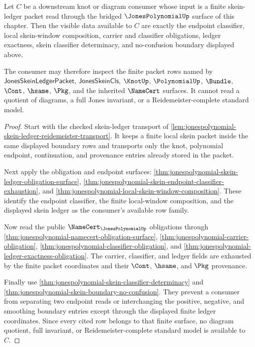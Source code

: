 \begin{theorem}
\label{thm:jonespolynomial-mature-consumer-example}
Let $C$ be a downstream knot or diagram consumer whose input is a finite
skein-ledger packet read through the bridged $\JonesPolynomialUp$ surface of
this chapter. Then the visible data available to $C$ are exactly the endpoint
classifier, local skein-window composition, carrier and classifier obligations,
ledger exactness, skein classifier determinacy, and no-confusion boundary
displayed above.

The consumer may therefore inspect the finite packet rows named by
$\mathsf{JonesSkeinLedgerPacket}$, $\mathsf{JonesSkeinCls}$, $\KnotUp$,
$\PolynomialUp$, $\Bundle$, $\Cont$, $\hsame$, $\Pkg$, and the inherited
$\NameCert$ surfaces. It cannot read a quotient of diagrams, a full Jones
invariant, or a Reidemeister-complete standard model.
\end{theorem}
\begin{proof}
Start with the checked skein-ledger transport of
\autoref{lem:jonespolynomial-skein-ledger-reidemeister-transport}. It keeps a
finite local skein packet inside the same displayed boundary rows and transports
only the knot, polynomial endpoint, continuation, and provenance entries already
stored in the packet.

Next apply the obligation and endpoint surfaces:
\autoref{thm:jonespolynomial-skein-ledger-obligation-surface},
\autoref{thm:jonespolynomial-skein-endpoint-classifier-exhaustion}, and
\autoref{thm:jonespolynomial-local-skein-window-composition}. These identify the
endpoint classifier, the finite local-window composition, and the displayed
skein ledger as the consumer's available row family.

Now read the public $\NameCert_{\JonesPolynomialUp}$ obligations through
\autoref{thm:jonespolynomial-namecert-obligation-surface},
\autoref{thm:jonespolynomial-carrier-obligation},
\autoref{thm:jonespolynomial-classifier-obligation}, and
\autoref{thm:jonespolynomial-ledger-exactness-obligation}. The carrier,
classifier, and ledger fields are exhausted by the finite packet coordinates and
their $\Cont$, $\hsame$, and $\Pkg$ provenance.

Finally use
\autoref{thm:jonespolynomial-skein-classifier-determinacy} and
\autoref{thm:jonespolynomial-skein-boundary-no-confusion}. They prevent a
consumer from separating two endpoint reads or interchanging the positive,
negative, and smoothing boundary entries except through the displayed finite
ledger coordinates. Since every cited row belongs to that finite surface, no
diagram quotient, full invariant, or Reidemeister-complete standard model is
available to $C$.
\end{proof}

